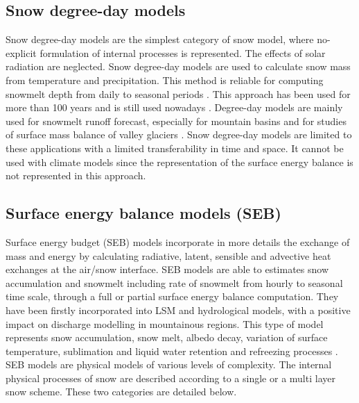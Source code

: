 \documentclass[hydrology,article,submit,moreauthors,pdftex]{Definitions/mdpi}
\begin{document}
\subsection{Snow degree-day models}

Snow degree-day models are the simplest category of snow model, where no-explicit formulation of internal processes is represented. The effects of solar radiation are neglected. Snow degree-day models are used to calculate snow mass from temperature and precipitation. This method is reliable for computing snowmelt depth from daily to seasonal periods \citep{Rango_1995}. This approach has been used for more than 100 years and is still used nowadays \citep{Clyde_1931,Collins_1934}. Degree-day models are mainly used for snowmelt runoff forecast, especially for mountain basins and for studies of surface mass balance of valley glaciers \citep{Finsterwalder_1887,Singh_2000,Braithwaite_2008,Reveillet_2017}. 
Snow degree-day models are limited to these applications with a limited transferability in time and space. It cannot be used with climate models since the representation of the surface energy balance is not represented in this approach.


\subsection{Surface energy balance models (SEB)}

Surface energy budget (SEB) models incorporate in more details the exchange of mass and energy by calculating radiative, latent, sensible and advective heat exchanges at the air/snow interface. SEB models are able to estimates snow accumulation and snowmelt including rate of snowmelt from hourly to seasonal time scale, through a full or partial surface energy balance computation. They have been firstly incorporated into LSM and hydrological models, with a positive impact on discharge modelling in mountainous regions. %
This type of model represents snow accumulation, snow melt, albedo decay, variation of surface temperature, sublimation and liquid water retention and refreezing processes \citep{Tarboton_1996,Mahat_2012}. SEB models are physical models of various levels of complexity. The internal physical processes of snow are described according to a single or a multi layer snow scheme. These two categories are detailed below.
\end{document}
